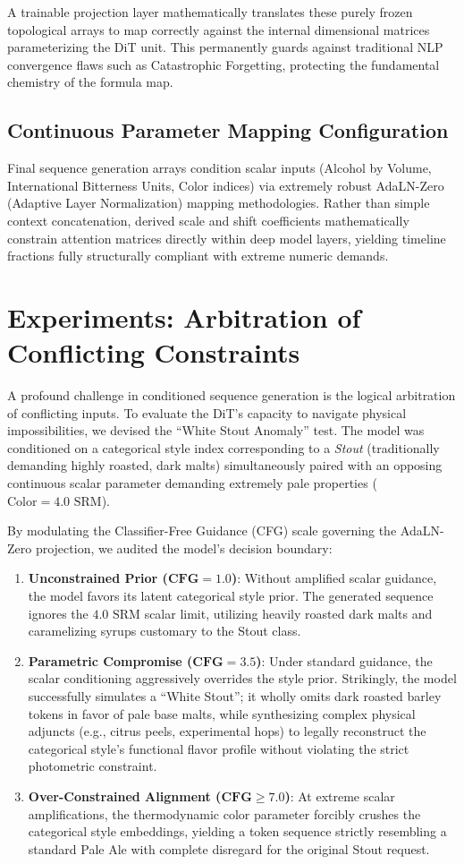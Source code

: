\documentclass[10pt,twocolumn,letterpaper]{article}
\begin{document}
A trainable projection layer mathematically translates these purely frozen topological arrays to map correctly against the internal dimensional matrices parameterizing the DiT unit. This permanently guards against traditional NLP convergence flaws such as Catastrophic Forgetting, protecting the fundamental chemistry of the formula map.

\subsection{Continuous Parameter Mapping Configuration}
Final sequence generation arrays condition scalar inputs (Alcohol by Volume, International Bitterness Units, Color indices) via extremely robust AdaLN-Zero (Adaptive Layer Normalization) mapping methodologies. Rather than simple context concatenation, derived scale and shift coefficients mathematically constrain attention matrices directly within deep model layers, yielding timeline fractions fully structurally compliant with extreme numeric demands.

\section{Experiments: Arbitration of Conflicting Constraints}
A profound challenge in conditioned sequence generation is the logical arbitration of conflicting inputs. To evaluate the DiT's capacity to navigate physical impossibilities, we devised the ``White Stout Anomaly'' test. The model was conditioned on a categorical style index corresponding to a \textit{Stout} (traditionally demanding highly roasted, dark malts) simultaneously paired with an opposing continuous scalar parameter demanding extremely pale properties ($\text{Color} = 4.0 \text{ SRM}$).

By modulating the Classifier-Free Guidance (CFG) scale governing the AdaLN-Zero projection, we audited the model's decision boundary:
\begin{enumerate}
    \item \textbf{Unconstrained Prior ($\mathbf{CFG = 1.0}$)}: Without amplified scalar guidance, the model favors its latent categorical style prior. The generated sequence ignores the $4.0 \text{ SRM}$ scalar limit, utilizing heavily roasted dark malts and caramelizing syrups customary to the Stout class.
    \item \textbf{Parametric Compromise ($\mathbf{CFG = 3.5}$)}: Under standard guidance, the scalar conditioning aggressively overrides the style prior. Strikingly, the model successfully simulates a ``White Stout''; it wholly omits dark roasted barley tokens in favor of pale base malts, while synthesizing complex physical adjuncts (e.g., citrus peels, experimental hops) to legally reconstruct the categorical style's functional flavor profile without violating the strict photometric constraint.
    \item \textbf{Over-Constrained Alignment ($\mathbf{CFG \geq 7.0}$)}: At extreme scalar amplifications, the thermodynamic color parameter forcibly crushes the categorical style embeddings, yielding a token sequence strictly resembling a standard Pale Ale with complete disregard for the original Stout request.
\end{enumerate}
\end{document}
